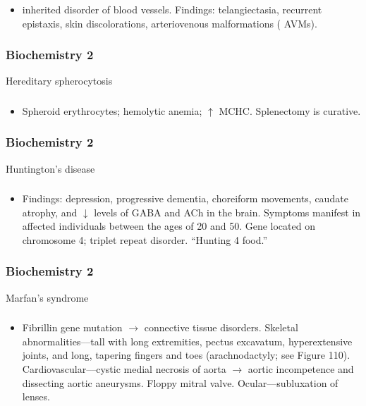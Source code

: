 \documentclass[11pt]{beamer}
\begin{document}
\begin{frame}
 \frametitle{}
\begin{itemize}
\item  inherited disorder of blood vessels. Findings: telangiectasia, recurrent epistaxis, skin discolorations, arteriovenous malformations ( AVMs).
\end{itemize}
\end{frame}

\begin{frame}
 \frametitle{Biochemistry 2}
Hereditary spherocytosis
\end{frame}

\begin{frame}
 \frametitle{}
\begin{itemize}
\item Spheroid erythrocytes; hemolytic anemia; ${\uparrow}$ MCHC. Splenectomy is curative.
\end{itemize}
\end{frame}

\begin{frame}
 \frametitle{Biochemistry 2}
Huntington’s disease
\end{frame}

\begin{frame}
 \frametitle{}
\begin{itemize}
\item Findings: depression, progressive dementia, choreiform movements, caudate atrophy, and ${\downarrow}$ levels of GABA and ACh in the brain. Symptoms manifest in affected individuals between the ages of 20 and 50. Gene located on chromosome 4; triplet repeat disorder. “Hunting 4 food.”
\end{itemize}
\end{frame}

\begin{frame}
 \frametitle{Biochemistry 2}
Marfan’s syndrome
\end{frame}

\begin{frame}
 \frametitle{}
\begin{itemize}
\item Fibrillin gene mutation ${\rightarrow}$ connective tissue disorders. Skeletal abnormalities––tall with long extremities, pectus excavatum, hyperextensive \\ joints, and long, tapering fingers and toes (arachnodactyly; see Figure 110). Cardiovascular––cystic medial necrosis of aorta ${\rightarrow}$ aortic incompetence and \\ dissecting aortic aneurysms. Floppy mitral valve. Ocular––subluxation of lenses.
\end{itemize}
\end{frame}
\end{document}

